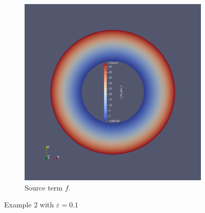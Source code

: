 \documentclass[12pt]{ociamthesis}
\begin{document}
\begin{figure}[H]
\begin{subfigure}{0.5\textwidth}
     \includegraphics[width=\textwidth]{Pics/uf/F_E2_eps_1.png}
     \caption{Source term $f$.}
 \end{subfigure}
 \caption{Example $2$ with $\varepsilon = 0.1$} \label{E2_uf}
\end{figure}
\end{document}
